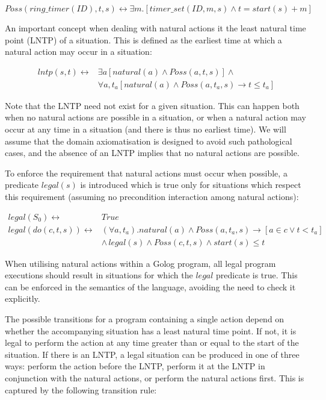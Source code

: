 \documentclass[letterpaper]{article}
\begin{document}
\[
Poss(ring\_ timer(ID),t,s)\leftrightarrow\exists m.\left[timer\_ set(ID,m,s)\wedge t=start(s)+m\right]
\]


An important concept when dealing with natural actions it the least
natural time point (LNTP) of a situation. This is defined as the earliest
time at which a natural action may occur in a situation:

\begin{align*}
lntp(s,t)\leftrightarrow & \exists a\left[natural(a)\wedge Poss(a,t,s)\right]\wedge\\
 & \forall a,t_{a}\left[natural(a)\wedge Poss(a,t_{a},s)\rightarrow t\leq t_{a}\right]
\end{align*}


Note that the LNTP need not exist for a given situation. This can
happen both when no natural actions are possible in a situation, or
when a natural action may occur at any time in a situation (and there
is thus no earliest time). We will assume that the domain axiomatisation
is designed to avoid such pathological cases, and the absence of an
LNTP implies that no natural actions are possible.

To enforce the requirement that natural actions must occur when possible,
a predicate $legal(s)$ is introduced which is true only for situations
which respect this requirement (assuming no precondition interaction
among natural actions):

\begin{align*}
legal(S_{0}) \leftrightarrow & True\\
legal(do(c,t,s)) \leftrightarrow & (\forall a,t_{a}).natural(a)\wedge Poss(a,t_{a},s)\rightarrow\left[a\in c\vee t<t_{a}\right]\\
 & \wedge\, legal(s)\wedge Poss(c,t,s)\wedge start(s)\leq t
\end{align*}


When utilising natural actions within a Golog program, all legal program
executions should result in situations for which the $legal$ predicate
is true. This can be enforced in the semantics of the language, avoiding
the need to check it explicitly.

The possible transitions for a program containing a single action
depend on whether the accompanying situation has a least natural time
point. If not, it is legal to perform the action at any time greater
than or equal to the start of the situation. If there is an LNTP,
a legal situation can be produced in one of three ways: perform the
action before the LNTP, perform it at the LNTP in conjunction with
the natural actions, or perform the natural actions first. This is
captured by the following transition rule:
\end{document}
